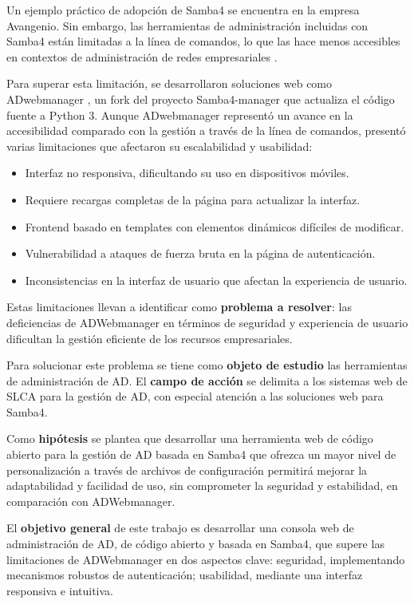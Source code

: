Un ejemplo práctico de adopción de Samba4 se encuentra en la empresa Avangenio. Sin embargo, las herramientas de administración incluidas con Samba4 están limitadas a la línea de comandos, lo que las hace menos accesibles en contextos de administración de redes empresariales \autocite{bartlett_samba_2005,imanudin_active_2019,samba_what_2019}.

Para superar esta limitación, se desarrollaron soluciones web como ADwebmanager \autocite{jerez_vicentgjad-webmanager_2024}, un fork del proyecto Samba4-manager \autocite{graber_stgrabersamba4-manager_2024} que actualiza el código fuente a Python 3. Aunque ADwebmanager representó un avance en la accesibilidad comparado con la gestión a través de la línea de comandos, presentó varias limitaciones que afectaron su escalabilidad y usabilidad:

\begin{itemize}
    \item Interfaz no responsiva, dificultando su uso en dispositivos móviles.
    \item Requiere recargas completas de la página para actualizar la interfaz.
    \item Frontend basado en templates con elementos dinámicos difíciles de modificar.
    \item Vulnerabilidad a ataques de fuerza bruta en la página de autenticación.
    \item Inconsistencias en la interfaz de usuario que afectan la experiencia de usuario.
\end{itemize}

Estas limitaciones llevan a identificar como \textbf{problema a resolver}: las deficiencias de ADWebmanager en términos de seguridad y experiencia de usuario dificultan la gestión eficiente de los recursos empresariales.

Para solucionar este problema se tiene como \textbf{objeto de estudio} las herramientas de administración de AD. El \textbf{campo de acción} se delimita a los sistemas web de SLCA para la gestión de AD, con especial atención a las soluciones web para Samba4.

Como \textbf{hipótesis} se plantea que desarrollar una herramienta web de código abierto para la gestión de AD basada en Samba4 que ofrezca un mayor nivel de personalización a través de archivos de configuración permitirá mejorar la adaptabilidad y facilidad de uso, sin comprometer la seguridad y estabilidad, en comparación con ADWebmanager.

El \textbf{objetivo general} de este trabajo es desarrollar una consola web de administración de AD, de código abierto y basada en Samba4, que supere las limitaciones de ADWebmanager en dos aspectos clave: seguridad, implementando mecanismos robustos de autenticación; usabilidad, mediante una interfaz responsiva e intuitiva.






